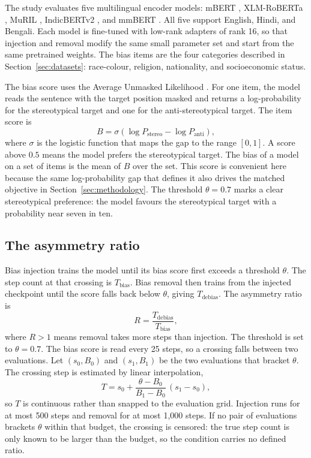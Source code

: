 \documentclass[Afour,sageh,times]{sagej}
\begin{document}
The study evaluates five multilingual encoder models: mBERT \citep{devlin2019bert}, XLM-RoBERTa \citep{conneau2020unsupervised}, MuRIL \citep{khanuja2021muril}, IndicBERTv2 \citep{doddapaneni2023indicbert}, and mmBERT \citep{mmbert2025}. All five support English, Hindi, and Bengali. Each model is fine-tuned with low-rank adapters \citep{hu2022lora} of rank 16, so that injection and removal modify the same small parameter set and start from the same pretrained weights. The bias items are the four categories described in Section~\ref{sec:datasets}: race-colour, religion, nationality, and socioeconomic status.

The bias score uses the Average Unmasked Likelihood \citep{kaneko2022unmasking}. For one item, the model reads the sentence with the target position masked and returns a log-probability for the stereotypical target and one for the anti-stereotypical target. The item score is
\begin{equation}
B = \sigma\!\left(\log P_{\mathrm{stereo}} - \log P_{\mathrm{anti}}\right),
\label{eq:bias}
\end{equation}
where $\sigma$ is the logistic function that maps the gap to the range $[0,1]$. A score above $0.5$ means the model prefers the stereotypical target. The bias of a model on a set of items is the mean of $B$ over the set. This score is convenient here because the same log-probability gap that defines it also drives the matched objective in Section~\ref{sec:methodology}. The threshold $\theta = 0.7$ marks a clear stereotypical preference: the model favours the stereotypical target with a probability near seven in ten.

\subsection{The asymmetry ratio}

Bias injection trains the model until its bias score first exceeds a threshold $\theta$. The step count at that crossing is $T_{\mathrm{bias}}$. Bias removal then trains from the injected checkpoint until the score falls back below $\theta$, giving $T_{\mathrm{debias}}$. The asymmetry ratio is
\begin{equation}
R = \frac{T_{\mathrm{debias}}}{T_{\mathrm{bias}}},
\label{eq:R}
\end{equation}
where $R > 1$ means removal takes more steps than injection. The threshold is set to $\theta = 0.7$. The bias score is read every 25 steps, so a crossing falls between two evaluations. Let $(s_0, B_0)$ and $(s_1, B_1)$ be the two evaluations that bracket $\theta$. The crossing step is estimated by linear interpolation,
\begin{equation}
T = s_0 + \frac{\theta - B_0}{B_1 - B_0}\,(s_1 - s_0),
\label{eq:cross}
\end{equation}
so $T$ is continuous rather than snapped to the evaluation grid. Injection runs for at most 500 steps and removal for at most 1{,}000 steps. If no pair of evaluations brackets $\theta$ within that budget, the crossing is censored: the true step count is only known to be larger than the budget, so the condition carries no defined ratio.
\end{document}
